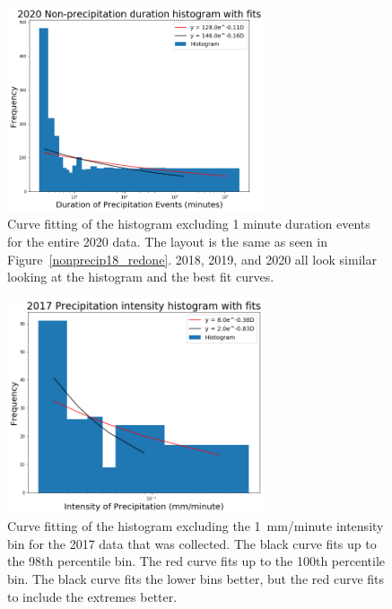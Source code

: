 \documentclass[11pt]{report}
\begin{document}
\begin{figure}[b]
  \centering
  \includegraphics[width=0.675\textwidth]{Figures/nonprecip_2020_new.png}
  \caption[2020 Non-precipitation duration Exponentials with contrasting curve fitting]
  {\label{nonprecip20_redone}Curve fitting of the histogram excluding
    1 minute duration events for the entire 2020 data. The layout is the
    same as seen in Figure~\ref{nonprecip18_redone}. 2018, 2019, and 2020 all look
    similar looking at the histogram and the best fit curves.}
\end{figure}

\clearpage
\begin{figure}[t]
	\centering
	\includegraphics[width=0.675\textwidth]{Figures/inten2017_fit.png}
	\caption[Fitting Intensity histogram for 2017 with different bins]
	{\label{i2017_fit} Curve fitting of the histogram excluding the 1~mm/minute intensity bin for the 2017 data that was collected. The black curve fits up to the 98th percentile bin. The red curve fits up to the 100th percentile bin. The black curve fits the lower bins better, but the red curve fits to include the extremes better.  }
\end{figure}
\end{document}
